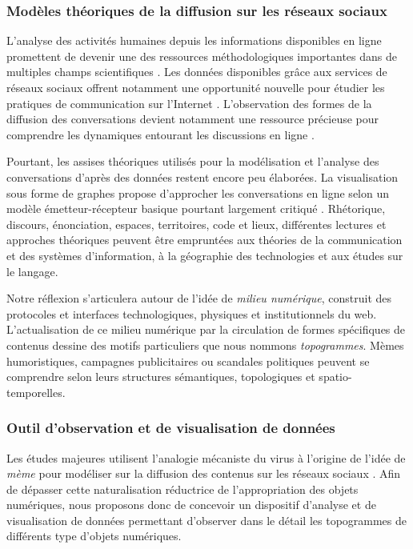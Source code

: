 \subsubsection{Modèles théoriques de la diffusion sur les réseaux sociaux}

L'analyse des activités humaines depuis les informations disponibles en ligne promettent de devenir une des ressources méthodologiques importantes dans de multiples champs scientifiques \citep{Schreibman2007, Guichard2014}. Les données disponibles grâce aux services de réseaux sociaux offrent notamment une opportunité nouvelle pour étudier les pratiques de communication sur l'Internet \citep{Zook2007,Nettleton2013,Manovich2011}. L'observation des formes de la diffusion des conversations devient notamment une ressource précieuse pour comprendre les dynamiques entourant les discussions en ligne \citep{Conover2013,Leetaru2013}.
 
Pourtant, les assises théoriques utilisés pour la modélisation et l'analyse des conversations d'après des données restent encore peu élaborées. La visualisation sous forme de graphes propose d'approcher les conversations en ligne selon un modèle émetteur-récepteur basique pourtant largement critiqué \citep{Proulx2000}. Rhétorique, discours, énonciation, espaces, territoires, code et lieux, différentes lectures et approches théoriques peuvent être empruntées aux théories de la communication et des systèmes d'information, à la géographie des technologies et aux études sur le langage.

Notre réflexion s'articulera autour de l'idée de \textit{milieu numérique}, construit des protocoles et interfaces technologiques, physiques et institutionnels du web. L'actualisation de ce milieu numérique par la circulation de formes spécifiques de contenus dessine des motifs particuliers que nous nommons \textit{topogrammes}. Mèmes humoristiques, campagnes publicitaires ou scandales politiques peuvent se comprendre selon leurs structures sémantiques, topologiques et spatio-temporelles.

\subsubsection{Outil d'observation et de visualisation de données}

Les études majeures utilisent l'analogie mécaniste du virus à l'origine de l'idée de \textit{mème} \cite{Dawkins1984, Blackmore2001} pour modéliser sur la diffusion des contenus sur les réseaux sociaux \cite{Leskovec1996, Adamic2014}. Afin de dépasser cette naturalisation réductrice de l'appropriation des objets numériques, nous proposons donc de concevoir un dispositif d'analyse et de visualisation de données permettant d'observer dans le détail les topogrammes de différents type d'objets numériques. 

